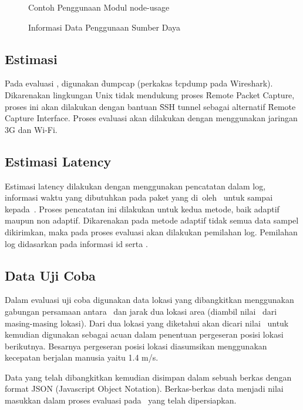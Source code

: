 \noindent
\begin{figure}
	\centering
	\lstset{basicstyle=\ttfamily,frame=single,language=javascript}
	
	\caption{Contoh Penggunaan Modul node-usage}
\label{fig:usage}
\end{figure}


\noindent
\begin{figure}
	\centering
	\lstset{basicstyle=\ttfamily,frame=single,language=javascript}
	
	\caption{Informasi Data Penggunaan Sumber Daya}
\label{fig:usage_result}
\end{figure}

\subsection{Estimasi \Bandwidth}

Pada evaluasi \bandwidth, digunakan \f{dumpcap} (perkakas \f{tcpdump} pada
Wireshark). Dikarenakan lingkungan Unix tidak mendukung proses \f{Remote Packet
	Capture}, proses ini akan dilakukan dengan bantuan \f{SSH tunnel} sebagai
alternatif \f{Remote Capture Interface}. Proses evaluasi akan dilakukan dengan
menggunakan jaringan 3G dan Wi-Fi.


\subsection{Estimasi Latency}

Estimasi latency dilakukan dengan menggunakan pencatatan dalam log, informasi
waktu yang dibutuhkan pada paket yang di\publish~oleh \publisher~untuk sampai
kepada~\subscriber. Proses pencatatan ini dilakukan untuk kedua metode, baik
adaptif maupun non adaptif. Dikarenakan pada metode adaptif tidak semua data
sampel dikirimkan, maka pada proses evaluasi akan dilakukan pemilahan log.
Pemilahan log didasarkan pada informasi id serta \publisher.


\subsection{Data Uji Coba}

Dalam evaluasi uji coba digunakan data lokasi yang dibangkitkan menggunakan
gabungan persamaan antara \bearing~dan jarak dua lokasi area (diambil nilai
\centroid~dari masing-masing lokasi). Dari dua lokasi yang diketahui akan dicari
nilai \bearing~untuk kemudian digunakan sebagai acuan dalam penentuan pergeseran
posisi lokasi berikutnya. Besarnya pergeseran posisi lokasi diasumsikan
menggunakan kecepatan berjalan manusia yaitu 1.4 m/s.

Data yang telah dibangkitkan kemudian disimpan dalam sebuah berkas dengan format
JSON (Javascript Object Notation). Berkas-berkas data menjadi nilai masukkan
dalam proses evaluasi pada \testbed~yang telah dipersiapkan.


